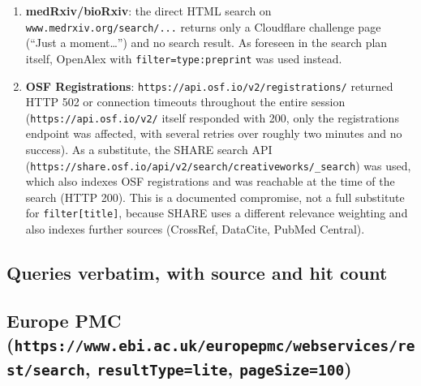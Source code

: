 \begin{enumerate}
\def\labelenumi{\arabic{enumi}.}
\tightlist
\item
  \textbf{medRxiv/bioRxiv}: the direct HTML search on \texttt{www.medrxiv.org/search/...} returns only a Cloudflare challenge page (``Just a moment\ldots{}'') and no search result. As foreseen in the search plan itself, OpenAlex with \texttt{filter=type:preprint} was used instead.
\item
  \textbf{OSF Registrations}: \texttt{https://api.osf.io/v2/registrations/} returned HTTP 502 or connection timeouts throughout the entire session (\texttt{https://api.osf.io/v2/} itself responded with 200, only the registrations endpoint was affected, with several retries over roughly two minutes and no success). As a substitute, the SHARE search API (\texttt{https://share.osf.io/api/v2/search/creativeworks/\_search}) was used, which also indexes OSF registrations and was reachable at the time of the search (HTTP 200). This is a documented compromise, not a full substitute for \texttt{filter{[}title{]}}, because SHARE uses a different relevance weighting and also indexes further sources (CrossRef, DataCite, PubMed Central).
\end{enumerate}

\subsection{Queries verbatim, with source and hit count}\label{queries-verbatim-with-source-and-hit-count}

\subsection{\texorpdfstring{Europe PMC (\texttt{https://www.ebi.ac.uk/europepmc/webservices/rest/search}, \texttt{resultType=lite}, \texttt{pageSize=100})}{Europe PMC (https://www.ebi.ac.uk/europepmc/webservices/rest/search, resultType=lite, pageSize=100)}}\label{europe-pmc-httpswww.ebi.ac.ukeuropepmcwebservicesrestsearch-resulttypelite-pagesize100}

